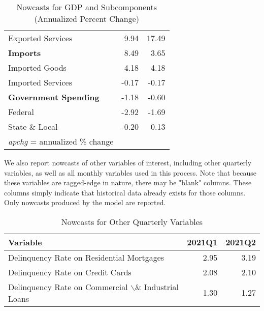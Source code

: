 \documentclass[11pt, letterpaper]{article}\usepackage[]{graphicx}\usepackage[]{color}
\begin{document}
\begin{table}[H]
\begin{tabular}{lrr}
  \hspace{8mm}  Exported Services & 9.94 & 17.49 \\ 
  \hspace{0mm} \textbf{Imports} & 8.49 & 3.65 \\ 
  \hspace{8mm}  Imported Goods & 4.18 & 4.18 \\ 
  \hspace{8mm}  Imported Services & -0.17 & -0.17 \\ 
  \hspace{0mm} \textbf{Government Spending} & -1.18 & -0.60 \\ 
  \hspace{8mm}  Federal & -2.92 & -1.69 \\ 
  \hspace{8mm}  State \& Local & -0.20 & 0.13 \\ 
   \hline 
 \textit{apchg} = annualized \% change 
\end{tabular}
\endgroup
\caption{Nowcasts for GDP and Subcomponents (Annualized Percent Change)} 
\end{table}


We also report nowcasts of other variables of interest, including other quarterly variables, as well as all monthly variables used in this process. Note that because these variables are ragged-edge in nature, there may be "blank" columns. These columns simply indicate that historical data already exists for those columns. Only nowcasts produced by the model are reported.
\begin{table}[H]
\centering
\begingroup\fontsize{11pt}{13pt}\selectfont
\begin{tabular}{lrr}
  \hline
Variable & 2021Q1 & 2021Q2 \\ 
  \hline
Delinquency Rate on Residential Mortgages & 2.95 & 3.19 \\ 
  Delinquency Rate on Credit Cards & 2.08 & 2.10 \\ 
  Delinquency Rate on Commercial $\backslash$\& Industrial Loans & 1.30 & 1.27 \\ 
   \hline
\end{tabular}
\endgroup
\caption{Nowcasts for Other Quarterly Variables} 
\end{table}
\end{document}
